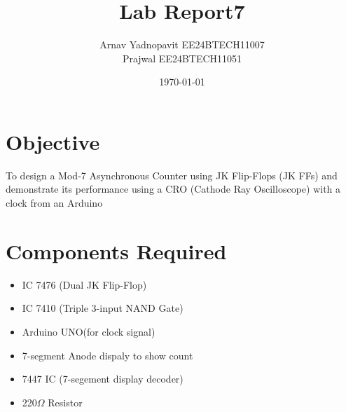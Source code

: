 \documentclass[12pt,a4paper]{article}
\title{Lab Report7}
\author{Arnav Yadnopavit EE24BTECH11007\\Prajwal EE24BTECH11051}
\date{\today}
\begin{document}
\maketitle
\section{Objective}
To design a Mod-7 Asynchronous Counter using JK Flip-Flops (JK FFs) and demonstrate its
performance using a CRO (Cathode Ray Oscilloscope) with a clock from an Arduino
\section{Components Required}
\begin{itemize}
    \item IC 7476 (Dual JK Flip-Flop)
    \item IC 7410 (Triple 3-input NAND Gate)
    \item Arduino UNO(for clock signal)
    \item 7-segment Anode dispaly to show count
    \item 7447 IC (7-segement display decoder)
    \item 220$\Omega$ Resistor
\end{itemize}
\end{document}
